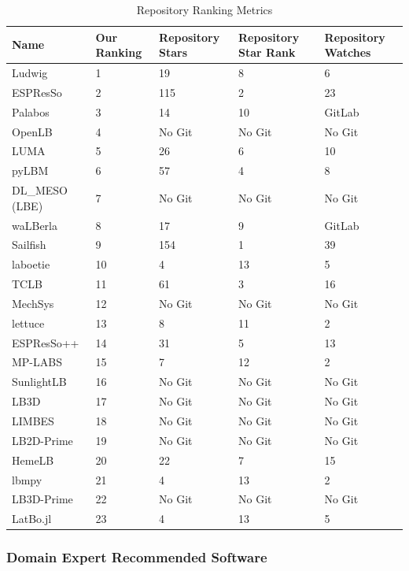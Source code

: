 \documentclass[final, 3p, times, authoryear]{elsarticle}
\begin{document}
\begin{table}
\begin{center}
		\begin{tabular}{ p{3.5cm}p{2.5cm}p{2cm}p{2cm}p{2cm} }
			\hline
			Name & Our Ranking & Repository Stars & Repository Star Rank & Repository Watches \\
			\hline
			Ludwig&1& 19 &8& 6\\
			ESPResSo &2& 115 &2& 23\\
			Palabos &3& 14 &10& GitLab\\
			OpenLB &4& No Git &No Git & No Git\\
			LUMA&5& 26 &6& 10\\
			pyLBM &6& 57&4& 8\\
			DL\_MESO (LBE) & 7 & No Git &No Git & No Git \\
			waLBerla & 8 & 17 &9& GitLab\\
			Sailfish &9& 154 &1& 39\\
			laboetie &10& 4 &13& 5\\
			TCLB &11& 61 &3& 16\\
			MechSys &12& No Git &No Git & No Git\\
			lettuce &13& 8 &11& 2\\
			ESPResSo++ &14& 31 &5& 13\\
			MP-LABS &15& 7 &12& 2\\			
			SunlightLB & 16& No Git &No Git & No Git\\
			LB3D &17& No Git &No Git & No Git\\			
			LIMBES &18& No Git &No Git & No Git\\
			LB2D-Prime &19& No Git &No Git & No Git\\		
			HemeLB &20& 22 &7& 15\\
			lbmpy&21&  4 &13& 2  \\	
			LB3D-Prime &22& No Git &No Git & No Git\\	
			LatBo.jl &23& 4 &13& 5\\			
			\hline
		\end{tabular}
		\caption{Repository Ranking Metrics} \label{repometrics}
\end{center}
\end{table}

\subsubsection{Domain Expert Recommended Software} \label{domainexpertrecommend}
\end{document}
